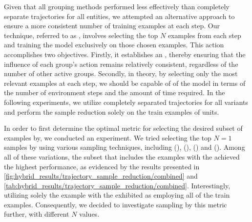 \noindent Given that all grouping methods performed less effectively than completely separate trajectories for all entities, we attempted an alternative approach to ensure a more consistent number of training examples at each step. Our technique, referred to as , involves selecting the top $N$ examples from each step and training the model exclusively on those chosen examples. This action accomplishes two objectives. Firstly, it establishes an , thereby ensuring that the influence of each group's action remains relatively consistent, regardless of the number of other active groups. Secondly, in theory, by selecting only the most relevant examples at each step, we should be capable of  of the model in terms of the number of environment steps and the amount of time required. In the following experiments, we utilize completely separated trajectories for all variants and perform the sample reduction solely on the train examples of units.

\bigskip

\noindent In order to first determine the optimal metric for selecting the desired subset of examples by, we conducted an experiment. We tried selecting the top $N=1$ samples by using various sampling techniques, including  (),  (),  () and  (). Among all of these variations, the subset that includes the examples with the  achieved the highest performance, as evidenced by the results presented in \autoref{fig:hybrid_results/trajectory_sample_reduction/combined} and \autoref{tab:hybrid_results/trajectory_sample_reduction/combined}. Interestingly, utilizing solely the example with the  exhibited  as employing all of the train examples. Consequently, we decided to investigate sampling by this metric further, with different $N$ values.

